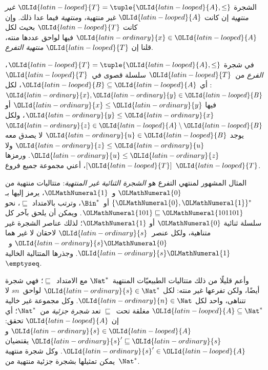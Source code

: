 \documentclass[../../../include/open-logic-section]{subfiles}
\begin{document}
\begin{defn}
الشجرة $\OLId{latin-looped}{T} = \tuple{\OLId{latin-looped}{A}, \le}$ \emph{غير منتهية} إن كانت $\OLId{latin-looped}{A}$ غير
منتهية، و\emph{منتهية} فيما عدا ذلك. وإن كانت $\OLId{latin-looped}{T}$ بحيث لكل $\OLId{latin-ordinary}{x} \in \OLId{latin-looped}{A}$ فيها
لواحق عددها منته، قلنا إن $\OLId{latin-looped}{T}$ \emph{منتهية التفرع}.
\end{defn}

\begin{defn}[الفروع]
في شجرة $\OLId{latin-looped}{T} = \tuple{\OLId{latin-looped}{A}, \le}$، \emph{الفرع} من~$\OLId{latin-looped}{T}$ سلسلة قصوى في~$\OLId{latin-looped}{T}$:
أي $\OLId{latin-looped}{B} \subseteq \OLId{latin-looped}{A}$، لكل $\OLId{latin-ordinary}{x}, \OLId{latin-ordinary}{y} \in \OLId{latin-looped}{B}$ فيها $\OLId{latin-ordinary}{x} \le \OLId{latin-ordinary}{y}$ أو $\OLId{latin-ordinary}{y} \le \OLId{latin-ordinary}{x}$،
ولكل $\OLId{latin-ordinary}{z} \in \OLId{latin-looped}{A} \setminus \OLId{latin-looped}{B}$ يوجد $\OLId{latin-ordinary}{u} \in \OLId{latin-looped}{B}$ لا يصدق معه $\OLId{latin-ordinary}{z} \le \OLId{latin-ordinary}{u}$
ولا $\OLId{latin-ordinary}{u} \le \OLId{latin-ordinary}{z}$.
%
ورمزها $[\OLId{latin-looped}{T}]$، أعني مجموعة جميع فروع $\OLId{latin-looped}{T}$.
\end{defn}

\begin{ex}
المثال المشهور لمنتهي التفرع هو \emph{الشجرة الثنائية غير المنتهية}:
متتاليات منتهية من $\OLMathNumeral{0}$ و~$\OLMathNumeral{1}$، يرمز إليها بـ$\{\OLMathNumeral{0},\OLMathNumeral{1}\}^*$ أو~$\Bin^*$،
وترتب بالامتداد $\sqsubseteq$، نحو $\OLMathNumeral{101} \sqsubseteq \OLMathNumeral{101101}$.
ويمكن أن يلحق بآخر كل سلسلة ثنائية $\OLMathNumeral{0}$ أو $\OLMathNumeral{1}$؛ لذلك عناصر الشجرة
غير متناهية، ولكل عنصر~$\OLId{latin-ordinary}{s}$ لاحقان لا غير هما $\OLId{latin-ordinary}{s}\OLMathNumeral{0}$ و~$\OLId{latin-ordinary}{s}\OLMathNumeral{1}$.
وجذرها المتتالية الخالية $\emptyseq$.
\end{ex}

\begin{ex}
وأعم قليلًا من ذلك متتاليات الطبيعيّات المنتهية~$\Nat^*$ مع
الامتداد~$\sqsubseteq$؛ فهي شجرة أيضًا، ولكن تفرعها غير منته:
لكل $\OLId{latin-ordinary}{s} \in \Nat^*$ لواحق~$sn$ لا تتناهى، واحد لكل $\OLId{latin-ordinary}{n} \in \Nat$.
وكل مجموعة غير خالية $\OLId{latin-looped}{A} \subseteq \Nat^*$ مغلقة تحت~$\sqsubseteq$ تعد
\emph{شجرة جزئية} من~$\Nat^*$؛ أي إن $\OLId{latin-looped}{A}$ تحقق: $\OLId{latin-ordinary}{s} \in \OLId{latin-looped}{A}$ و$\OLId{latin-ordinary}{s}' \sqsubseteq \OLId{latin-ordinary}{s}$
يقتضيان $\OLId{latin-ordinary}{s}' \in \OLId{latin-looped}{A}$. وكل شجرة منتهية يمكن تمثيلها بشجرة جزئية
منتهية من~$\Nat^*$.
\end{ex}
\end{document}
